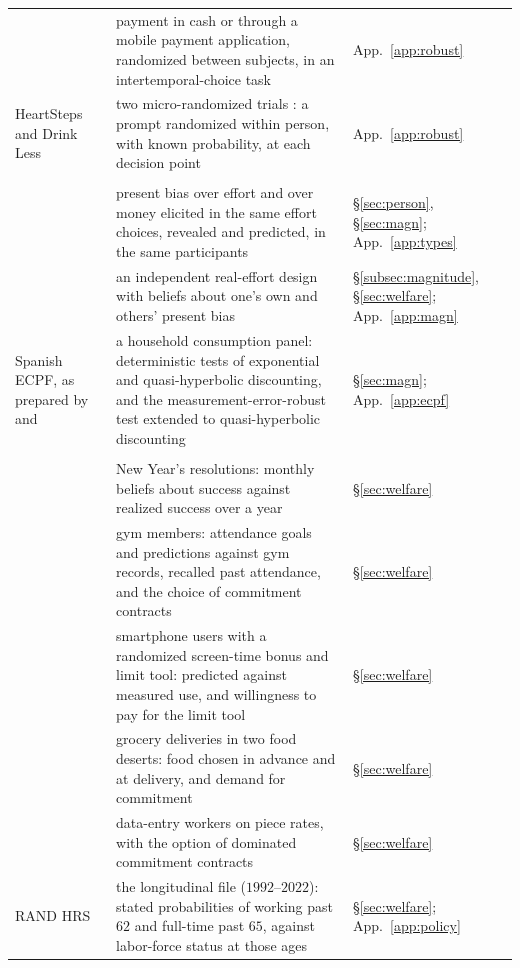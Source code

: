 \documentclass[11pt,a4paper]{article}
\theoremstyle{plain}
\theoremstyle{definition}
\begin{document}
\begin{table}[H]
{\begin{tabular}{@{}>{\raggedright\arraybackslash}p{3.3cm}>{\raggedright\arraybackslash}p{10.25cm}>{\raggedright\arraybackslash}p{2.05cm}@{}}
\citet{hoel2022} & payment in cash or through a mobile payment application, randomized between subjects, in an intertemporal-choice task & App.~\ref{app:robust} \\
HeartSteps and Drink Less & two micro-randomized trials \citep{klasnja2019,bell2023}: a prompt randomized within person, with known probability, at each decision point & App.~\ref{app:robust} \\
\addlinespace[4pt]
\multicolumn{3}{@{}l@{}}{\textit{The person, magnitudes and types}} \\
\citet{cerrone2026} & present bias over effort and over money elicited in the same effort choices, revealed and predicted, in the same participants & \S\ref{sec:person}, \S\ref{sec:magn}; App.~\ref{app:types} \\
\citet{fedyk2024} & an independent real-effort design with beliefs about one's own and others' present bias & \S\ref{subsec:magnitude}, \S\ref{sec:welfare}; App.~\ref{app:magn} \\
Spanish ECPF, as prepared by \citet{adams2014} and \citet{aguiar2021} & a household consumption panel: deterministic tests of exponential and quasi-hyperbolic discounting, and the measurement-error-robust test extended to quasi-hyperbolic discounting & \S\ref{sec:magn}; App.~\ref{app:ecpf} \\
\addlinespace[4pt]
\multicolumn{3}{@{}l@{}}{\textit{Plans, beliefs and commitment}} \\
\citet{oscarsson2020} & New Year's resolutions: monthly beliefs about success against realized success over a year & \S\ref{sec:welfare} \\
\citet{carrera2022} & gym members: attendance goals and predictions against gym records, recalled past attendance, and the choice of commitment contracts & \S\ref{sec:welfare} \\
\citet{allcott2022} & smartphone users with a randomized screen-time bonus and limit tool: predicted against measured use, and willingness to pay for the limit tool & \S\ref{sec:welfare} \\
\citet{sadoff2020} & grocery deliveries in two food deserts: food chosen in advance and at delivery, and demand for commitment & \S\ref{sec:welfare} \\
\citet{kaur2015} & data-entry workers on piece rates, with the option of dominated commitment contracts & \S\ref{sec:welfare} \\
RAND HRS & the longitudinal file ($1992$--$2022$): stated probabilities of working past $62$ and full-time past $65$, against labor-force status at those ages & \S\ref{sec:welfare}; App.~\ref{app:policy} \\

\end{tabular}}
\end{table}
\end{document}
